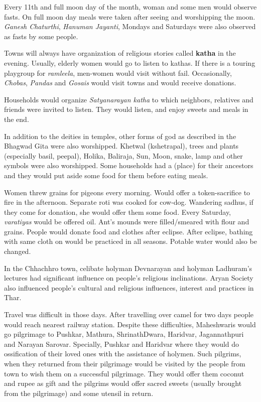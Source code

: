 Every 11th and full moon day of the month, woman and some men would observe
fasts. On full moon day meals were taken after seeing and worshipping the moon.
\textit{Ganesh Chaturthi}, \textit{Hanuman Jayanti}, Mondays and Saturdays were
also observed as fasts by some people.

Towns will always have organization of religious stories called \textbf{katha}
in the evening. Usually, elderly women would go to listen to kathas. If there
is a touring playgroup for \textit{ramleela}, men-women would visit without
fail. Occasionally, \textit{Chobas}, \textit{Pandas} and \textit{Gosais} would
visit towns and would receive donations.

Households would organize \textit{Satyanarayan katha} to which neighbors,
relatives and friends were invited to listen. They would listen, and enjoy
sweets and meals in the end.

In addition to the deities in temples, other forms of god as described in the
Bhagwad Gita were also worshipped. Khetwal (kshetrapal), trees and plants
(especially basil, peepal), Holika, Baliraja, Sun, Moon, snake, lamp and other
symbols were also worshipped. Some households had a  (place) for
their ancestors and they would put aside some food for them before eating
meals.

Women threw grains for pigeons every morning. Would offer a token-sacrifice to
fire in the afternoon. Separate roti was cooked for cow-dog. Wandering sadhus,
if they come for donation, she would offer them some food. Every Saturday,
\textit{varatiyas} would be offered oil. Ant's mounds were filled/smeared with
flour and grains. People would donate food and clothes after eclipse. After
eclipse, bathing with same cloth on would be practiced in all seasons.  Potable
water would also be changed.

In the Chhachhro town, celibate holyman Devnarayan and holyman Ladhuram's
lectures had significant influence on people's religious inclinations. Aryan
Society also influenced people's cultural and religious influences, interest
and practices in Thar.

Travel was difficult in those days. After travelling over camel for two days
people would reach nearest railway station. Despite these difficulties,
Maheshwaris would go pilgrimage to Pushkar, Mathura, ShrinathDwara, Haridvar,
Jagannathpuri and Narayan Sarovar. Specially, Pushkar and Haridvar where they
would do ossification of their loved ones with the assistance of holymen. Such
pilgrims, when they returned from their pilgrimage would be visited by the
people from town to wish them on a successful pilgrimage. They would offer them
coconut and rupee as gift and the pilgrims would offer sacred sweets (usually
brought from the pilgrimage) and some utensil in return.

